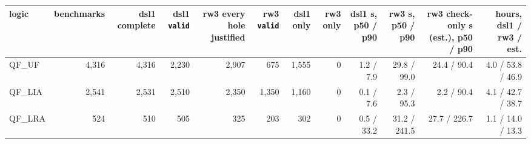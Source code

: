 \begin{tabular}{lrrrrrrrrrrr}
\toprule
logic & benchmarks & dsl1 complete & dsl1 \texttt{valid} & rw3 every hole justified & rw3 \texttt{valid} & dsl1 only & rw3 only & dsl1 s, p50 / p90 & rw3 s, p50 / p90 & rw3 check-only s (est.), p50 / p90 & hours, dsl1 / rw3 / est. \\
\midrule
QF\_UF & 4,316 & 4,316 & 2,230 & 2,907 & 675 & 1,555 & 0 & 1.2 / 7.9 & 29.8 / 99.0 & 24.4 / 90.4 & 4.0 / 53.8 / 46.9 \\
QF\_LIA & 2,541 & 2,531 & 2,510 & 2,350 & 1,350 & 1,160 & 0 & 0.1 / 7.6 & 2.3 / 95.3 & 2.2 / 90.4 & 4.1 / 42.7 / 38.7 \\
QF\_LRA & 524 & 510 & 505 & 325 & 203 & 302 & 0 & 0.5 / 33.2 & 31.2 / 241.5 & 27.7 / 226.7 & 1.1 / 14.0 / 13.3 \\
\bottomrule
\end{tabular}
